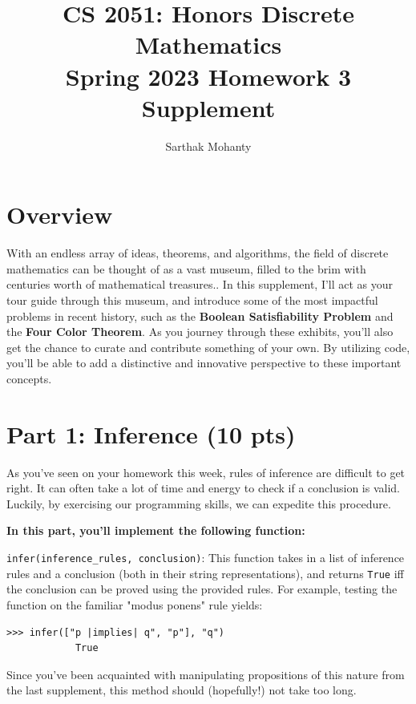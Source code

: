 \documentclass{article}
\title{\vspace{-1cm}CS 2051: Honors Discrete Mathematics \\Spring 2023 Homework 3 Supplement}
\author{Sarthak Mohanty}
\date{}
\begin{document}
\maketitle

\section*{Overview}
    With an endless array of ideas, theorems, and algorithms, the field of discrete mathematics can be thought of as a vast museum, filled to the brim with centuries worth of mathematical treasures.. In this supplement, I'll act as your tour guide through this museum, and introduce some of the most impactful problems in recent history, such as the \textbf{Boolean Satisfiability Problem} and the \textbf{Four Color Theorem}. As you journey through these exhibits, you'll also get the chance to curate and contribute something of your own. By utilizing code, you'll be able to add a distinctive and innovative perspective to these important concepts.

\section*{Part 1: Inference (10 pts)}
    As you've seen on your homework this week, rules of inference are difficult to get right. It can often take a lot of time and energy to check if a conclusion is valid. Luckily, by exercising our programming skills, we can expedite this procedure.

    \vspace{3mm}
    \textbf{In this part, you'll implement the following function:}
    \begin{tcolorbox}[colback=blue!10]
        \lstinline{infer(inference_rules, conclusion)}: This function takes in a list of inference rules and a conclusion (both in their string representations), and returns \verb+True+ iff the conclusion can be proved using the provided rules. For example, testing the function on the familiar "modus ponens" rule yields:
        \begin{lstlisting}[belowskip=-10pt]
            >>> infer(["p |implies| q", "p"], "q")
            True
        \end{lstlisting}
    \end{tcolorbox}
    Since you've been acquainted with manipulating propositions of this nature from the last supplement, this method should (hopefully!) not take too long.

\vspace{-1mm}
\end{document}
